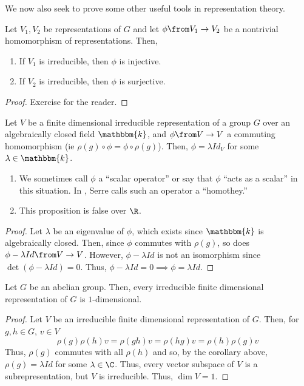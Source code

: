 \documentclass[11pt,leqno,oneside]{amsbook}
\newcommand{\bbk}{\mathbbm{k}}
\numberwithin{thm}{section}
\begin{document}
We now also seek to prove some other useful tools in representation
theory.
\begin{thm}
  Let \(V_1, V_2\) be representations of \(G\) and let \(\phi \from
  V_1 \to V_2\) be a nontrivial homomorphism of representations. Then,
  \begin{enumerate}
  \item If \(V_1\) is irreducible, then \(\phi\) is injective.
  \item If \(V_2\) is irreducible, then \(\phi\) is surjective.
  \end{enumerate}
\end{thm}
\begin{proof}
  Exercise for the reader.
\end{proof}
\begin{cor}\label{schur-alg-closed}
  Let \(V\) be a finite dimensional irreducible representation of a
  group \(G\) over an algebraically closed field \(\bbk\), and \(\phi
  \from V \to V\) a commuting homomorphism (ie \(\rho(g) \circ \phi = \phi
  \circ \rho(g)\)). Then, \(\phi = \lambda Id_V\) for some \(\lambda
  \in \bbk\).
\end{cor}
\begin{rmk}
  \begin{enumerate}
  \item We sometimes call \(\phi\) a ``scalar operator'' or say that
    \(\phi\) ``acts as a scalar'' in this situation. In \cite{serre},
    Serre calls such an operator a ``homothey.''
  \item This proposition is false over \(\R\).
  \end{enumerate}
\end{rmk}
\begin{proof}
  Let \(\lambda\) be an eigenvalue of \(\phi\), which exists since
  \(\bbk\) is algebraically closed. Then, since \(\phi\) commutes with
  \(\rho(g)\), so does \(\phi - \lambda Id \from V \to V\). However, \(\phi -
  \lambda Id\) is not an isomorphism since \(\det(\phi - \lambda Id) =
  0\). Thus, \(\phi - \lambda Id = 0 \implies \phi = \lambda Id\).
\end{proof}
\begin{cor}
  Let \(G\) be an abelian group. Then, every irreducible finite
  dimensional representation of \(G\) is \(1\)-dimensional.
\end{cor}
\begin{proof}
  Let \(V\) be an irreducible finite dimensional representation of
  \(G\). Then, for \(g,h \in G\), \(v \in V\) \[
    \rho(g) \rho(h) v = \rho(gh)v = \rho(hg)v = \rho(h)\rho(g) v
  \]
  Thus, \(\rho(g)\) commutes with all \(\rho(h)\) and so, by the
  corollary above, \(\rho(g) = \lambda Id\) for some \(\lambda \in
  \C\). Thus, every vector subspace of \(V\) is a subrepresentation,
  but \(V\) is irreducible. Thus, \(\dim V = 1\).
\end{proof}
\end{document}
